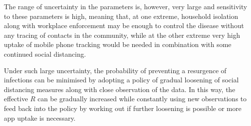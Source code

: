 \documentclass{article}
\begin{document}
The range of uncertainty in the parameters is, however, very large and sensitivity to these parameters is high, meaning that, at one extreme, household isolation along with workplace enforcement may be enough to control the disease without any tracing of contacts in the community, while at the other extreme very high uptake of mobile phone tracking would be needed in combination with some continued social distancing.

Under such large uncertainty, the probability of preventing a resurgence of infections can be minimised by adopting a policy of gradual loosening of social distancing measures along with close observation of the data. In this way, the effective $R$ can be gradually increased while constantly using new observations to feed back into the policy by working out if further loosening is possible or more app uptake is necessary.

%
% 


\end{document}
